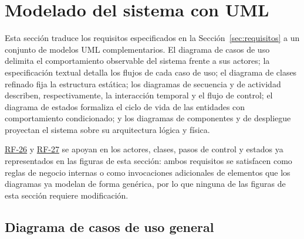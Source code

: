 \documentclass[journal,onecolumn]{IEEEtran}
\begin{document}
\begin{landscape}
\begin{longtable}{@{}p{1.3cm} p{1.3cm} p{4.6cm} p{3.6cm} p{5.2cm} p{1.6cm}@{}}
		\end{longtable}
	\end{landscape}

	
	\section{Modelado del sistema con UML}
	\label{sec:uml}
	
	Esta sección traduce los requisitos especificados en la
	Sección~\ref{sec:requisitos} a un conjunto de modelos UML complementarios.
	El diagrama de casos de uso delimita el comportamiento observable del
	sistema frente a sus actores; la especificación textual detalla los flujos
	de cada caso de uso; el diagrama de clases refinado fija la estructura
	estática; los diagramas de secuencia y de actividad describen,
	respectivamente, la interacción temporal y el flujo de control; el diagrama
	de estados formaliza el ciclo de vida de las entidades con comportamiento
	condicionado; y los diagramas de componentes y de despliegue proyectan el
	sistema sobre su arquitectura lógica y física.
	
	\hyperref[tab:RF-26]{RF-26} y \hyperref[tab:RF-27]{RF-27} se apoyan en los actores, clases, pasos de control y
	estados ya representados en las figuras de esta sección: ambos
	requisitos se satisfacen como reglas de negocio internas o como
	invocaciones adicionales de elementos que los diagramas ya modelan de forma
	genérica, por lo que ninguna de las figuras de esta sección requiere
	modificación.
	
	\subsection{Diagrama de casos de uso general}
	\label{sec:cu-general}
\end{document}
